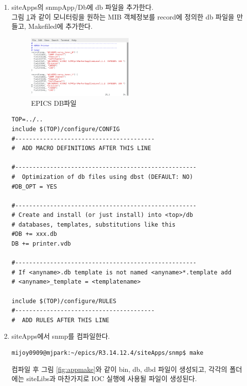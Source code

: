\documentclass[11pt
  , a4paper
  , article
  , oneside
]{memoir}
\begin{document}
\begin{enumerate}
\item siteApps의 snmpApp/Db에 db 파일을 추가한다.\\
그림 \ref{fig:db}과 같이 모니터링을 원하는 MIB 객체정보를 record에 정의한 db 파일을 만들고, Makefiled에 추가한다.

\begin{figure}[h!]
  \centering
  \includegraphics[width=0.5\textwidth]{./images/app.eps}
  \caption{EPICS DB파일}
  \label{fig:db}   
\end{figure}


\begin{lstlisting}[style=termstylenumber]
TOP=../..
include $(TOP)/configure/CONFIG
#----------------------------------------
#  ADD MACRO DEFINITIONS AFTER THIS LINE

#----------------------------------------------------
#  Optimization of db files using dbst (DEFAULT: NO)
#DB_OPT = YES

#----------------------------------------------------
# Create and install (or just install) into <top>/db
# databases, templates, substitutions like this
#DB += xxx.db
DB += printer.vdb

#----------------------------------------------------
# If <anyname>.db template is not named <anyname>*.template add
# <anyname>_template = <templatename>

include $(TOP)/configure/RULES
#----------------------------------------
#  ADD RULES AFTER THIS LINE
\end{lstlisting}

\item siteApps에서 snmp를 컴파일한다.

\begin{lstlisting}[style=termstyle]
mijoy0909@mjpark:~/epics/R3.14.12.4/siteApps/snmp$ make
\end{lstlisting}

컴파일 후 그림 \ref{fig:appmake}와 같이 bin, db, dbd 파일이 생성되고, 각각의 폴더에는 siteLibs과 마찬가지로 IOC 실행에 사용될 파일이 생성된다.


\end{enumerate}
\end{document}
